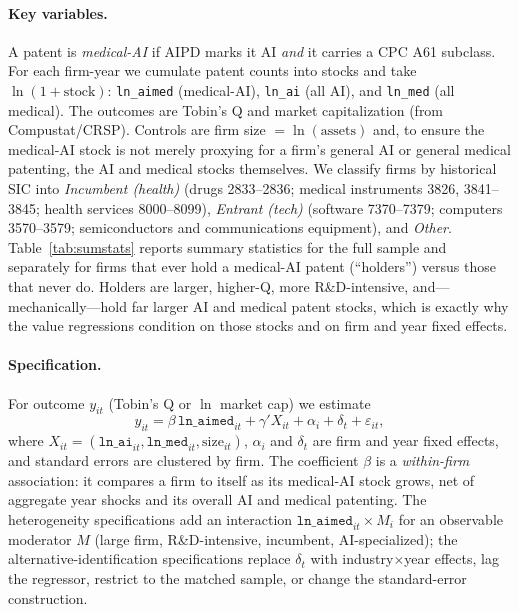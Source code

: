 \documentclass[12pt]{article}
\begin{document}
\paragraph{Key variables.} A patent is \emph{medical-AI} if AIPD marks it AI \emph{and} it carries
a CPC A61 subclass. For each firm-year we cumulate patent counts into stocks and take
$\ln(1+\text{stock})$: \texttt{ln\_aimed} (medical-AI), \texttt{ln\_ai} (all AI), and
\texttt{ln\_med} (all medical). The outcomes are Tobin's Q and market capitalization (from
Compustat/CRSP). Controls are firm size $=\ln(\text{assets})$ and, to ensure the medical-AI stock
is not merely proxying for a firm's general AI or general medical patenting, the AI and medical
stocks themselves. We classify firms by historical SIC into \emph{Incumbent (health)} (drugs
2833--2836; medical instruments 3826, 3841--3845; health services 8000--8099), \emph{Entrant
(tech)} (software 7370--7379; computers 3570--3579; semiconductors and communications equipment),
and \emph{Other}. Table~\ref{tab:sumstats} reports summary statistics for the full sample and
separately for firms that ever hold a medical-AI patent (``holders'') versus those that never do.
Holders are larger, higher-Q, more R\&D-intensive, and---mechanically---hold far larger AI and
medical patent stocks, which is exactly why the value regressions condition on those stocks and on
firm and year fixed effects.

\paragraph{Specification.} For outcome $y_{it}$ (Tobin's Q or $\ln$ market cap) we estimate
\begin{equation}
y_{it} = \beta\,\texttt{ln\_aimed}_{it} + \gamma'X_{it} + \alpha_i + \delta_t + \varepsilon_{it},
\label{eq:main}
\end{equation}
where $X_{it}=(\texttt{ln\_ai}_{it},\texttt{ln\_med}_{it},\text{size}_{it})$, $\alpha_i$ and
$\delta_t$ are firm and year fixed effects, and standard errors are clustered by firm. The
coefficient $\beta$ is a \emph{within-firm} association: it compares a firm to itself as its
medical-AI stock grows, net of aggregate year shocks and its overall AI and medical patenting.
The heterogeneity specifications add an interaction $\texttt{ln\_aimed}_{it}\times M_i$ for an
observable moderator $M$ (large firm, R\&D-intensive, incumbent, AI-specialized); the
alternative-identification specifications replace $\delta_t$ with industry$\times$year effects,
lag the regressor, restrict to the matched sample, or change the standard-error construction.
\end{document}
